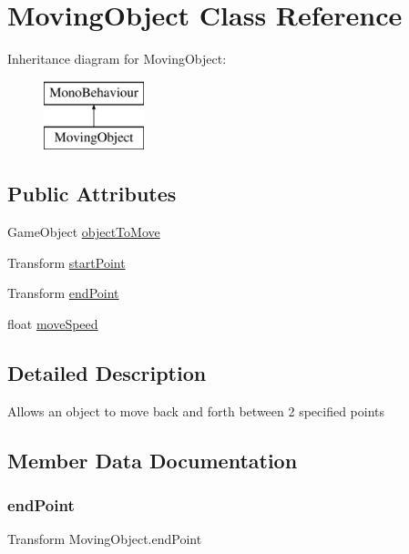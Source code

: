 \hypertarget{class_moving_object}{}\section{Moving\+Object Class Reference}
\label{class_moving_object}
Inheritance diagram for Moving\+Object\+:\begin{figure}[H]
\begin{center}
\leavevmode
\includegraphics[height=2.000000cm]{class_moving_object}
\end{center}
\end{figure}
\subsection*{Public Attributes}
\begin{DoxyCompactItemize}
\item 
Game\+Object \hyperlink{class_moving_object_af4b69a184bdd5b7fdf9f7971fd4f0a33}{object\+To\+Move}
\item 
Transform \hyperlink{class_moving_object_a0e64d125d08a40852bfb66f95ed1ae18}{start\+Point}
\item 
Transform \hyperlink{class_moving_object_a4e00544427448aa5032d17a86ab29ea7}{end\+Point}
\item 
float \hyperlink{class_moving_object_a1b309484a50fd82bf6a370cd7186da36}{move\+Speed}
\end{DoxyCompactItemize}


\subsection{Detailed Description}
Allows an object to move back and forth between 2 specified points 

\subsection{Member Data Documentation}
\mbox{\label{class_moving_object_a4e00544427448aa5032d17a86ab29ea7}} 
\subsubsection{\texorpdfstring{end\+Point}{endPoint}}
{\footnotesize\ttfamily Transform Moving\+Object.\+end\+Point}

